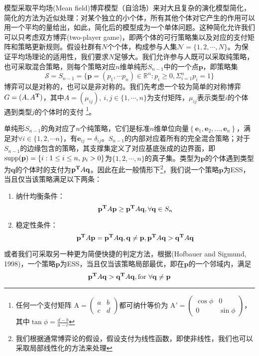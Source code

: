 \documentclass[lang=cn,12pt,a4paper]{elegantpaper}
\begin{document}
模型采取平均场(Mean field)博弈模型（自洽场）来对大且复杂的演化模型简化，简化的方法为近似处理：对某个独立的小个体，所有其他个体对它产生的作用可以用一个平均的量给出，如此，简化后的模型成为一个单体问题。这种简化允许我们可以只考虑双方博弈(two-player game)，即两个体的可行策略集以及对应的支付矩阵和策略更新规则。假设社群有$N$个个体，构成参与人集$\mathscr{N}=\{1,2,\cdots,N\}$。为保证平均场理论的适用性，我们要求\(N\)足够大。我们允许参与人既可以采取纯策略，也可采取混合策略，则每个策略对应$n$维单纯形$S_{n-1}$中的一个点$\mathbf{p}$，即策略集
\begin{equation}
    \mathscr{S}=S_{n-1}=\{\mathbf{p}=(p_1,\cdots p_n)\in \mathbb{R} ^n :p_i\ge0,\Sigma_{i=1}^n p_i=1\}
\end{equation}
博弈可以是对称的，也可以是非对称的。我们先考虑一个较为简单的对称博弈$G=(A,A^{\bf{T}})$，其中$A=(\mu_{ij}),\ i,j\in\{1,\cdots,n\}$为支付矩阵，$\mu_{ij}$表示类型$i$的个体遇到类型$j$的个体时的支付
\footnote{任何一个支付矩阵
\(\mathrm{A}=
\begin{pmatrix}
    a&b\\c&d
\end{pmatrix}\)都可纳什等价为
\(\mathrm{A'}=
\begin{pmatrix}
    \cos \phi&0\\0&\sin \phi
\end{pmatrix}\)，
其中\(\tan \phi=\frac{d-b}{a-c}\)
}。

单纯形$S_{n-1}$的角对应了$n$个纯策略，它们是标准$n$维单位向量$\left\{\boldsymbol{e}_{1}, \boldsymbol{e}_{2}, \ldots, \boldsymbol{e}_{n}\right\}$，满足对$\forall i\in\{1,2,\cdots n\}$，有$\boldsymbol{e}_{ij}=\delta _{ij}$。$S_{n-1}$的内部对应着所有的完全混合策略；对于$S_{n-1}$的边缘包含的策略，其支撑集定义了对应基底张成的边界面，即$\operatorname{supp}(\mathbf{p})=\left\{i: 1 \leq i \leq n \text,\ p_{i}>0\right\}$为$\{1,2, \cdots ,n\}$的真子集。类型为$\mathbf{p}$的个体遇到类型为$\mathbf{q}$的个体时的支付为$\mathbf{p}^{\bf{T}}A\mathbf{q}$。因此在此一般情形下\footnote{我们根据通常博弈论的假设，假设支付为线性函数，即使非线性，我们也可以采取局部线性化的方法来处理}，我们说一个策略$\mathbf{p}$为ESS，当且仅当该策略满足以下两条：

\begin{enumerate}
\item 纳什均衡条件：
\begin{equation}
\mathbf{p}^{\bf{T}}A\mathbf{p}\ge \mathbf{p}^{\bf{T}}A\mathbf{q}, \forall\mathbf{q}\in S_n
\end{equation}
\item 稳定性条件：
\begin{equation}
    \mathbf{p}^{\bf{T}}A\mathbf{p}=\mathbf{p}^{\bf{T}}A\mathbf{q},\mathbf{q}\ne \mathbf{p},\\
\mathbf{p}^{\bf{T}}A\mathbf{q} > \mathbf{q}^{\bf{T}}A\mathbf{q}
\end{equation}
\end{enumerate}
或者我们可采取另一种更为简便快捷的判定方法，根据(Hofbauer and Sigmund, 1998)，一个策略$\mathbf{p}$为ESS，当且仅当该策略局部最优，即在$\mathbf{p}$的一个邻域内，满足
\begin{equation}
\mathbf{p}^{\bf{T}}A\mathbf{q}>\mathbf{q}^{\bf{T}}A\mathbf{q}, \text{for }\forall \mathbf{q}\ne\mathbf{p}
\end{equation}
\end{document}

